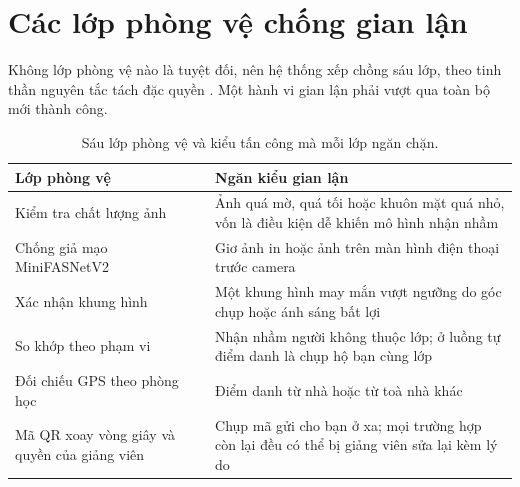 \section{Các lớp phòng vệ chống gian lận}
\label{sec:baolop}

Không lớp phòng vệ nào là tuyệt đối, nên hệ thống xếp chồng sáu lớp, theo tinh
thần nguyên tắc tách đặc quyền 
\cite{Saltzer1975Protection}. Một
hành vi gian lận phải vượt qua toàn bộ mới thành công.

\begin{table}[H]
\centering
\caption{Sáu lớp phòng vệ và kiểu tấn công mà mỗi lớp ngăn chặn.}
\label{tab:phongve}
\small
\begin{tabularx}{\textwidth}{@{}>{\raggedright\arraybackslash}p{4.2cm} X@{}}
\toprule
Lớp phòng vệ & Ngăn kiểu gian lận \\
\midrule
Kiểm tra chất lượng ảnh & Ảnh quá mờ, quá tối hoặc khuôn mặt quá nhỏ, vốn là
  điều kiện dễ khiến mô hình nhận nhầm \\
Chống giả mạo MiniFASNetV2 & Giơ ảnh in hoặc ảnh trên màn hình điện thoại
  trước camera \\
Xác nhận \FsoKhungXacNhan{} khung hình & Một khung hình may mắn vượt ngưỡng
  do góc chụp hoặc ánh sáng bất lợi \\
So khớp theo phạm vi & Nhận nhầm người không thuộc lớp; ở luồng tự điểm danh
  là chụp hộ bạn cùng lớp \\
Đối chiếu GPS theo phòng học & Điểm danh từ nhà hoặc từ toà nhà khác \\
Mã QR xoay vòng \FgiayDoiQr{} giây và quyền của giảng viên & Chụp mã gửi cho
  bạn ở xa; mọi trường hợp còn lại đều có thể bị giảng viên sửa lại kèm lý do \\
\bottomrule
\end{tabularx}
\end{table}

